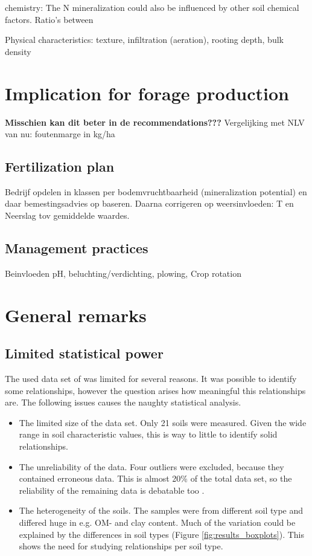 \documentclass[10pt,twoside,dutch,english]{report}
\begin{document}
	chemistry: 
The N mineralization could also be influenced by other soil chemical factors. Ratio's between

	Physical characteristics: texture, infiltration (aeration),  rooting depth, bulk density


\section{Implication for forage production}

\textbf{Misschien kan dit beter in de recommendations???}
Vergelijking met NLV van nu: foutenmarge in kg/ha 

\subsection{Fertilization plan}
Bedrijf opdelen in klassen per bodemvruchtbaarheid (mineralization potential) en daar bemestingsadvies op baseren. Daarna corrigeren op weersinvloeden: T en Neerslag tov gemiddelde waardes. 

\subsection{Management practices}
Beinvloeden pH, beluchting/verdichting, plowing, Crop rotation



\section{General remarks}
	
\subsection{Limited statistical power}
   The used data set of \citet{Echeverri2014} was limited for several reasons. It was possible to identify some relationships, however the question arises how meaningful this relationships are. The following issues causes the naughty statistical analysis. 
		   \begin{itemize}
   	\item The limited size of the data set. Only 21 soils were measured.  Given the wide range in soil characteristic values, this is way to little to identify solid relationships.
   	\item The unreliability of the data. Four outliers were excluded, because they contained erroneous data. This is almost 20\% of the total data set, so
   	 the reliability of the remaining data is debatable too . 
   	\item The heterogeneity of the soils. The samples were from different soil type and differed huge in e.g. OM- and clay content. Much of the variation could be explained by the differences in soil types (Figure \ref{fig:results_boxplots}). This shows the need for studying relationships per soil type. 
    \end{itemize} 
   
\end{document}
